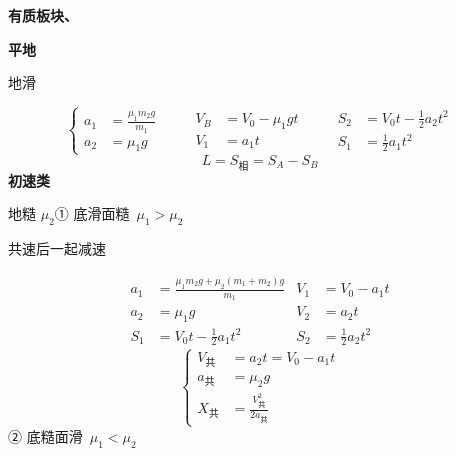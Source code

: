 \textbf{有质板块、}

\textbf{平地}

\noindent 地滑

\[
\left\{\begin{aligned}
a_1&=\frac{\mu_1m_2g}{m_1}\\
a_2&=\mu_1g
\end{aligned}\right.
\qquad
\begin{aligned}
V_B&=V_0-\mu_1gt\\
V_1&=a_1t
\end{aligned}
\qquad
\begin{aligned}
S_2&=V_0t-\frac12a_2t^2\\
S_1&=\frac12a_1t^2
\end{aligned}
\]%
\[
L=S_{\text{相}}=S_A-S_B
\]%
\textbf{初速类}

\noindent 地糙 $\mu_2$\quad ① 底滑面糙\ $\mu_1>\mu_2$

\noindent 共速后一起减速

\begin{align*}
a_1&=\frac{\mu_1m_2g+\mu_2(m_1+m_2)g}{m_1} & V_1&=V_0-a_1t\\
a_2&=\mu_1g & V_2&=a_2t\\
S_1&=V_0t-\frac12a_1t^2 & S_2&=\frac12a_2t^2
\end{align*}
\[
\left\{\begin{aligned}
V_{\text{共}}&=a_2t=V_0-a_1t\\
a_{\text{共}}&=\mu_2g\\
X_{\text{共}}&=\frac{V_{\text{共}}^2}{2a_{\text{共}}}
\end{aligned}\right.
\]
\noindent ② 底糙面滑\ $\mu_1<\mu_2$

